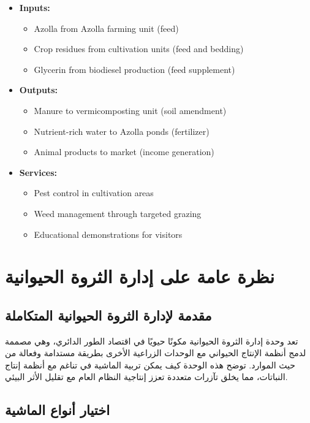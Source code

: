 \begin{itemize}
    \item \textbf{Inputs:}
    \begin{itemize}
        \item Azolla from Azolla farming unit (feed)
        \item Crop residues from cultivation units (feed and bedding)
        \item Glycerin from biodiesel production (feed supplement)
    \end{itemize}
    
    \item \textbf{Outputs:}
    \begin{itemize}
        \item Manure to vermicomposting unit (soil amendment)
        \item Nutrient-rich water to Azolla ponds (fertilizer)
        \item Animal products to market (income generation)
    \end{itemize}
    
    \item \textbf{Services:}
    \begin{itemize}
        \item Pest control in cultivation areas
        \item Weed management through targeted grazing
        \item Educational demonstrations for visitors
    \end{itemize}
\end{itemize}

\section{نظرة عامة على إدارة الثروة الحيوانية}

\subsection{مقدمة لإدارة الثروة الحيوانية المتكاملة}

تعد وحدة إدارة الثروة الحيوانية مكونًا حيويًا في اقتصاد الطور الدائري، وهي مصممة لدمج أنظمة الإنتاج الحيواني مع الوحدات الزراعية الأخرى بطريقة مستدامة وفعالة من حيث الموارد. توضح هذه الوحدة كيف يمكن تربية الماشية في تناغم مع أنظمة إنتاج النباتات، مما يخلق تآزرات متعددة تعزز إنتاجية النظام العام مع تقليل الأثر البيئي.

\subsection{اختيار أنواع الماشية}

